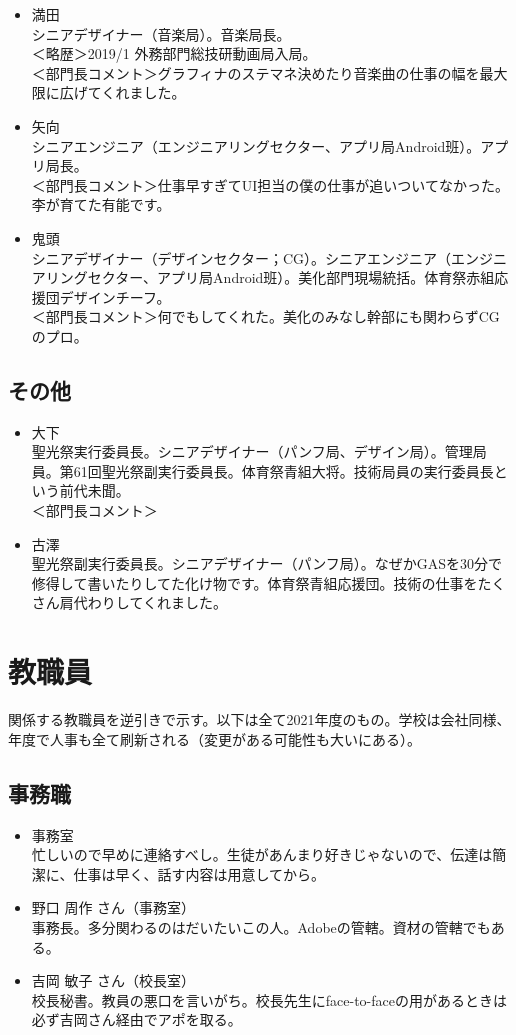 \documentclass[dvipdfmx,jb5]{jarticle}
\begin{document}
\begin{itemize}
  \item 満田\\
  シニアデザイナー（音楽局）。音楽局長。\\
  ＜略歴＞2019/1 外務部門総技研動画局入局。\\
  ＜部門長コメント＞グラフィナのステマネ決めたり音楽曲の仕事の幅を最大限に広げてくれました。
  \item 矢向\\
  シニアエンジニア（エンジニアリングセクター、アプリ局Android班）。アプリ局長。\\
  ＜部門長コメント＞仕事早すぎてUI担当の僕の仕事が追いついてなかった。李が育てた有能です。
  \item 鬼頭\\
  シニアデザイナー（デザインセクター；CG）。シニアエンジニア（エンジニアリングセクター、アプリ局Android班）。美化部門現場統括。体育祭赤組応援団デザインチーフ。\\
  ＜部門長コメント＞何でもしてくれた。美化のみなし幹部にも関わらずCGのプロ。
\end{itemize}
\subsection{その他}
\begin{itemize}
  \item 大下\\
  聖光祭実行委員長。シニアデザイナー（パンフ局、デザイン局）。管理局員。第61回聖光祭副実行委員長。体育祭青組大将。技術局員の実行委員長という前代未聞。\\
  ＜部門長コメント＞
  \item 古澤\\
  聖光祭副実行委員長。シニアデザイナー（パンフ局）。なぜかGASを30分で修得して書いたりしてた化け物です。体育祭青組応援団。技術の仕事をたくさん肩代わりしてくれました。
\end{itemize}
\section{教職員}
関係する教職員を逆引きで示す。以下は全て2021年度のもの。学校は会社同様、年度で人事も全て刷新される（変更がある可能性も大いにある）。
\subsection{事務職}
\begin{itemize}
  \item 事務室\\
  忙しいので早めに連絡すべし。生徒があんまり好きじゃないので、伝達は簡潔に、仕事は早く、話す内容は用意してから。
  \item 野口 周作 さん（事務室）\\
  事務長。多分関わるのはだいたいこの人。Adobeの管轄。資材の管轄でもある。
  \item 吉岡 敏子 さん（校長室）\\
  校長秘書。教員の悪口を言いがち。校長先生にface-to-faceの用があるときは必ず吉岡さん経由でアポを取る。
\end{itemize}
\end{document}
